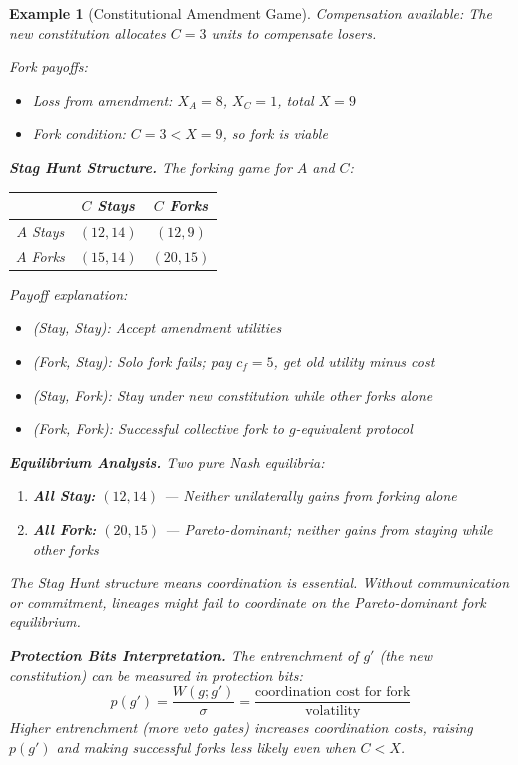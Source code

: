 \documentclass[12pt]{article}
\newtheorem{example}[theorem]{Example}
\begin{document}
\begin{example}[Constitutional Amendment Game]
\textit{Compensation available:} The new constitution allocates $C = 3$ units to compensate losers.

\textit{Fork payoffs:}
\begin{itemize}
    \item Loss from amendment: $X_A = 8$, $X_C = 1$, total $X = 9$
    \item Fork condition: $C = 3 < X = 9$, so fork is viable
\end{itemize}

\textbf{Stag Hunt Structure.}
The forking game for $A$ and $C$:

\begin{center}
\begin{tabular}{c|cc}
& $C$ Stays & $C$ Forks \\
\hline
$A$ Stays & $(12, 14)$ & $(12, 9)$ \\
$A$ Forks & $(15, 14)$ & $(20, 15)$ \\
\end{tabular}
\end{center}

Payoff explanation:
\begin{itemize}
    \item (Stay, Stay): Accept amendment utilities
    \item (Fork, Stay): Solo fork fails; pay $c_f = 5$, get old utility minus cost
    \item (Stay, Fork): Stay under new constitution while other forks alone
    \item (Fork, Fork): Successful collective fork to $g$-equivalent protocol
\end{itemize}

\textbf{Equilibrium Analysis.}
Two pure Nash equilibria:
\begin{enumerate}
    \item \textbf{All Stay:} $(12, 14)$ ---  Neither unilaterally gains from forking alone
    \item \textbf{All Fork:} $(20, 15)$ ---  Pareto-dominant; neither gains from staying while other forks
\end{enumerate}

The Stag Hunt structure means coordination is essential. Without communication or commitment, lineages might fail to coordinate on the Pareto-dominant fork equilibrium.

\textbf{Protection Bits Interpretation.}
The entrenchment of $g'$ (the new constitution) can be measured in protection bits:
\[
p(g') = \frac{W(g; g')}{\sigma} = \frac{\text{coordination cost for fork}}{\text{volatility}}
\]
Higher entrenchment (more veto gates) increases coordination costs, raising $p(g')$ and making successful forks less likely even when $C < X$.


\end{example}
\end{document}
